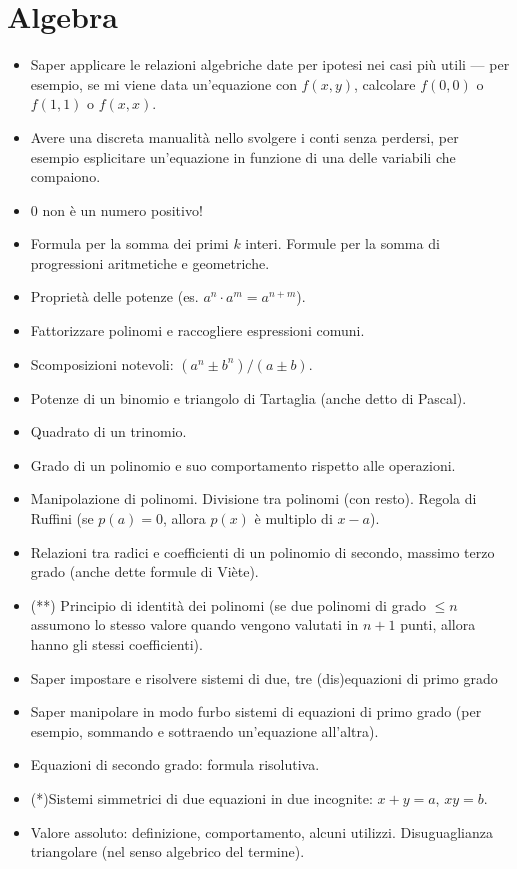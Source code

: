 \documentclass[a4paper,10pt]{paper}
\renewcommand{\star}{(*)}
\newcommand{\sstar}{(**)}
\begin{document}
\section{Algebra}
\begin{itemize}
 \item Saper applicare le relazioni algebriche date per ipotesi nei casi più utili --- per esempio, se mi viene data un'equazione con $f(x,y)$, calcolare $f(0,0)$ o $f(1,1)$ o $f(x,x)$.
 \item Avere una discreta manualità nello svolgere i conti senza perdersi, per esempio esplicitare un'equazione in funzione di una delle variabili che compaiono.
 \item $0$ non è un numero positivo!
 \item Formula per la somma dei primi $k$ interi. Formule per la somma di progressioni aritmetiche e geometriche.
 \item Proprietà delle potenze (es. $a^n\cdot a^m = a^{n+m}$).
 \item Fattorizzare polinomi e raccogliere espressioni comuni.
 \item Scomposizioni notevoli: $(a^n \pm b^n) / (a\pm b)$.
 \item Potenze di un binomio e triangolo di Tartaglia (anche detto di Pascal).
 \item Quadrato di un trinomio.
 \item Grado di un polinomio e suo comportamento rispetto alle operazioni.
 \item Manipolazione di polinomi. Divisione tra polinomi (con resto). Regola di Ruffini (se $p(a)=0$, allora $p(x)$ è multiplo di $x-a$).
 \item Relazioni tra radici e coefficienti di un polinomio di secondo, massimo terzo grado (anche dette formule di Viète).
 \item \sstar{} Principio di identità dei polinomi (se due polinomi di grado $\leq n$ assumono lo stesso valore quando vengono valutati in $n+1$ punti, allora hanno gli stessi coefficienti).
 \item Saper impostare e risolvere sistemi di due, tre (dis)equazioni di primo grado
 \item Saper manipolare in modo furbo sistemi di equazioni di primo grado (per esempio, sommando e sottraendo un'equazione all'altra).
 \item Equazioni di secondo grado: formula risolutiva.
 \item \star Sistemi simmetrici di due equazioni in due incognite: $x+y=a$, $xy=b$.
 \item Valore assoluto: definizione, comportamento, alcuni utilizzi. Disuguaglianza triangolare (nel senso algebrico del termine).

\end{itemize}
\end{document}
